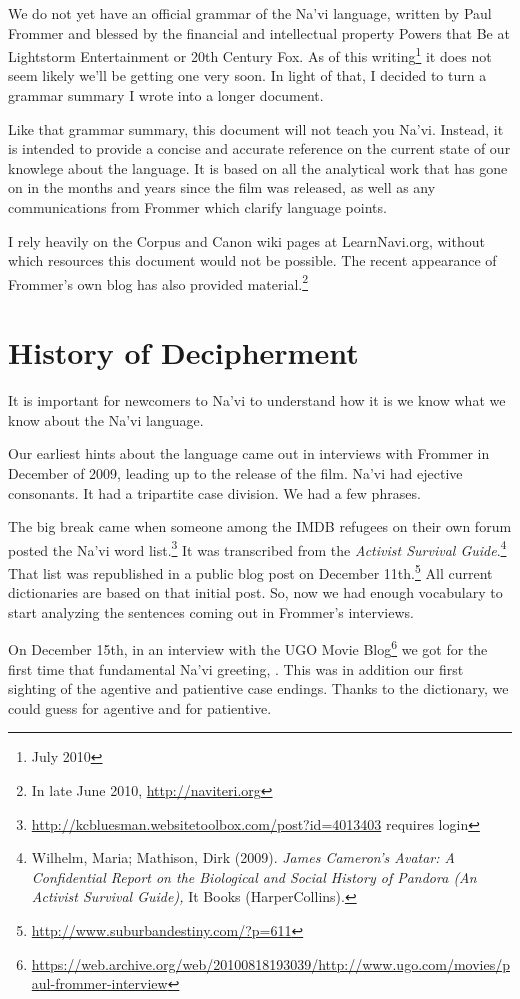 
We do not yet have an official grammar of the Na'vi language, written
by Paul Frommer and blessed by the financial and intellectual property
Powers that Be at Lightstorm Entertainment or 20th Century Fox.  As of
this writing\footnote{July 2010} it does not seem likely we'll be
getting one very soon. In light of that, I decided to turn a grammar
summary I wrote into a longer document.

Like that grammar summary, this document will not teach you Na'vi.
Instead, it is intended to provide a concise and accurate reference on
the current state of our knowlege about the language.  It is based on
all the analytical work that has gone on in the months and years since
the film was released, as well as any communications from Frommer
which clarify language points.

I rely heavily on the Corpus and Canon wiki pages at LearnNavi.org,
without which resources this document would not be possible.  The
recent appearance of Frommer's own blog has also provided
material.\footnote{In late June 2010, \url{http://naviteri.org}}


\section{History of Decipherment}
It is important for newcomers to Na'vi to understand how it is we know
what we know about the Na'vi language.

Our earliest hints about the language came out in interviews with
Frommer in December of 2009, leading up to the release of the film.
Na'vi had ejective consonants.  It had a tripartite case division.  We
had a few phrases.

The big break came when someone among the IMDB refugees on their own
forum posted the Na'vi word
list.\footnote{\url{http://kcbluesman.websitetoolbox.com/post?id=4013403}
requires login}  It was transcribed from the \textit{Activist
Survival Guide}.\footnote{Wilhelm, Maria; Mathison, Dirk (2009). \textit{James
Cameron's Avatar: A Confidential Report on the Biological and Social
History of Pandora (An Activist Survival Guide),} It Books (HarperCollins).}
That list was republished in a public blog post on December
11th.\footnote{\url{http://www.suburbandestiny.com/?p=611}} All
current dictionaries are based on that initial post.  So, now we had
enough vocabulary to start analyzing the sentences coming out in
Frommer's interviews.

On December 15th, in an interview with the UGO Movie
Blog\footnote{\url{https://web.archive.org/web/20100818193039/http://www.ugo.com/movies/paul-frommer-interview}}
we got for the first time that fundamental Na'vi greeting,  .  This was in addition our first
sighting of the agentive and patientive case endings.  Thanks to the
dictionary, we could guess  for agentive and  for
patientive.

